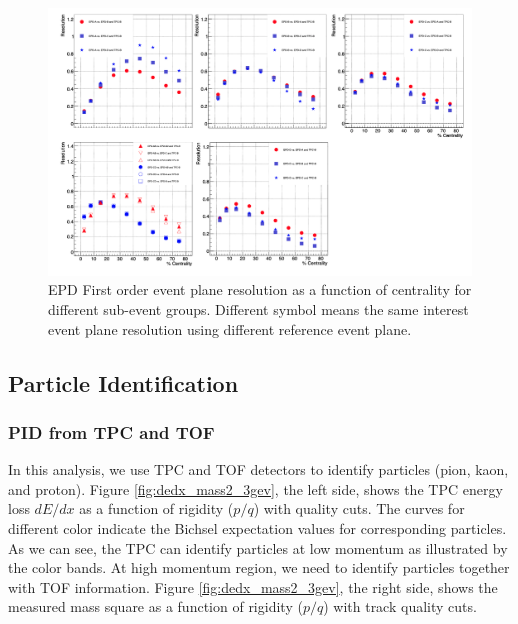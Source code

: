 \begin{figure}[ht]
\includegraphics[scale=0.4]{chapter2/fig/epd_1stresolution.png}
\caption{ EPD First order event plane resolution as a function of centrality for different sub-event groups. Different symbol means the same interest event plane resolution using different reference event plane.}
\label{fig:epd_1stres}
\end{figure}



\subsection{Particle Identification}
\subsubsection{PID from TPC and TOF}
In this analysis, we use TPC and TOF detectors to identify particles (pion, kaon, and proton). Figure \ref{fig:dedx_mass2_3gev}, the left side, shows the TPC energy loss $dE/dx$ as a function of rigidity ($p/q$) with quality cuts. The curves for different color indicate the Bichsel expectation values for corresponding particles. As we can see, the TPC can identify particles at low momentum as illustrated by the color bands. At high momentum region, we need to identify particles together with TOF information. Figure \ref{fig:dedx_mass2_3gev}, the right side, shows the measured mass square as a function of rigidity ($p/q$) with track quality cuts. 

